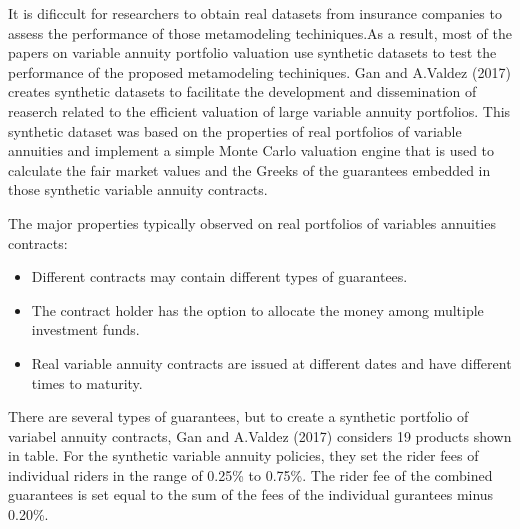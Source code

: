 It is dificcult for researchers to obtain real datasets from insurance companies to assess the performance of those metamodeling techiniques.As a result, most of the papers on variable annuity portfolio valuation use synthetic datasets to test the performance of the proposed metamodeling techiniques. Gan and A.Valdez (2017) creates synthetic datasets to facilitate the development and dissemination of reaserch related to the efficient valuation of large variable annuity portfolios. This synthetic dataset was based on the properties of real portfolios of variable annuities and implement a simple Monte Carlo valuation engine that is used to calculate the fair market values and the Greeks of the guarantees embedded in those synthetic variable annuity contracts.

The major properties typically observed on real portfolios of variables annuities contracts:

\begin{itemize}
\item Different contracts may contain different types of guarantees.
\item The contract holder has the option to allocate the money among multiple investment funds.
\item Real variable annuity contracts are issued at different dates and have different times to maturity.
\end{itemize}

There are several types of guarantees, but to create a synthetic portfolio of variabel annuity contracts, Gan and A.Valdez (2017) considers 19 products shown in table. For the synthetic variable annuity policies, they set the rider fees of individual riders in the range of 0.25\% to 0.75\%. The rider fee of the combined guarantees is set equal to the sum of the fees of the individual gurantees minus 0.20\%.

